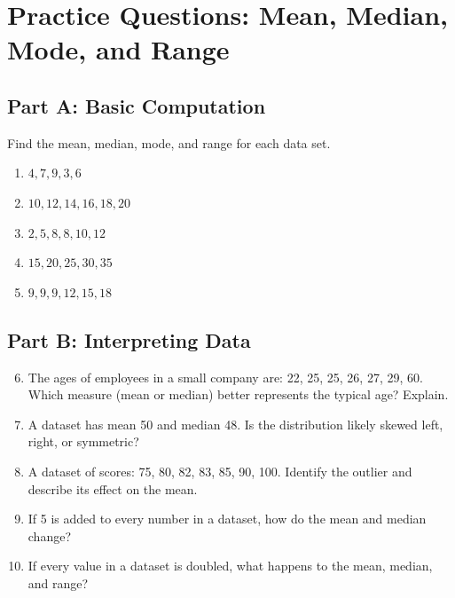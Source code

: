 \documentclass[14pt]{extarticle}
\begin{document}
\newpage


\section*{Practice Questions: Mean, Median, Mode, and Range}

\subsection*{Part A: Basic Computation}
Find the mean, median, mode, and range for each data set.
\begin{enumerate}
  \item \(4, 7, 9, 3, 6\)
  \item \(10, 12, 14, 16, 18, 20\)
  \item \(2, 5, 8, 8, 10, 12\)
  \item \(15, 20, 25, 30, 35\)
  \item \(9, 9, 9, 12, 15, 18\)
\end{enumerate}

\subsection*{Part B: Interpreting Data}
\begin{enumerate}
  \setcounter{enumi}{5}
  \item The ages of employees in a small company are: 22, 25, 25, 26, 27, 29, 60.  
  Which measure (mean or median) better represents the typical age? Explain.
  \item A dataset has mean 50 and median 48. Is the distribution likely skewed left, right, or symmetric?
  \item A dataset of scores: 75, 80, 82, 83, 85, 90, 100. Identify the outlier and describe its effect on the mean.
  \item If 5 is added to every number in a dataset, how do the mean and median change?
  \item If every value in a dataset is doubled, what happens to the mean, median, and range?
\end{enumerate}
\end{document}
